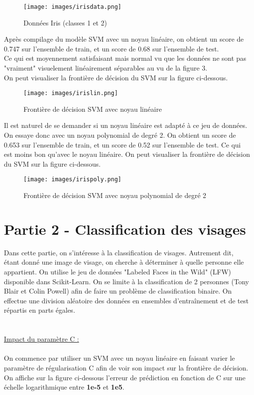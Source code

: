 \documentclass[a4paper, 12pt]{article}
\begin{document}
\begin{figure}[h]
    \centering
    \texttt{[image: images/irisdata.png]}
    \caption{Données Iris (classes 1 et 2)}
    \label{fig:iris_data}

\end{figure}

Après compilage du modèle SVM avec un noyau linéaire, on obtient un score de 0.747 sur l'ensemble de train, et un score de 0.68 sur l'ensemble de test.
\\
Ce qui est moyennement satisfaisant mais normal vu que les données ne sont pas "vraiment" visuelement linéairement séparables au vu de la figure 3.
\\
On peut visualiser la frontière de décision du SVM sur la figure ci-dessous.

\begin{figure}[h]
    \centering
    \texttt{[image: images/irislin.png]}
    \caption{Frontière de décision SVM avec noyau linéaire}
    \label{fig:linear_kernel_iris}
\end{figure}


Il est naturel de se demander si un noyau linéaire est adapté à ce jeu de données. On essaye donc avec un noyau polynomial de degré 2. On obtient un score de 0.653 sur l'ensemble de train, et un score de 0.52 sur l'ensemble de test.
Ce qui est moins bon qu'avec le noyau linéaire. On peut visualiser la frontière de décision du SVM sur la figure ci-dessous.

\begin{figure}[h]
    \centering
    \texttt{[image: images/irispoly.png]}
    \caption{Frontière de décision SVM avec noyau polynomial de degré 2}
    \label{fig:poly2_kernel_iris}
\end{figure}

\vspace{4cm}

\section*{Partie 2 - Classification des visages}

Dans cette partie, on s'intéresse à la classification de visages. Autrement dit, étant donné une image de visage, on cherche à déterminer à quelle personne elle appartient.
On utilise le jeu de données "Labeled Faces in the Wild" (LFW) disponible dans Scikit-Learn. On se limite à la classification de 2 personnes (Tony Blair et Colin Powell) afin de faire un problème de classification binaire.
On effectue une division aléatoire des données en ensembles d'entraînement et de test répartis en parts égales.
\\
\\
\\
\underline{Impact du paramètre C :}
\\
\\
On commence par utiliser un SVM avec un noyau linéaire en faisant varier le paramètre de régularisation C afin de voir son impact sur la frontière de décision.
\\
On affiche sur la figure ci-dessous  l'erreur de prédiction en fonction de C sur une échelle logarithmique entre \textbf{1e-5} et \textbf{1e5}.
\end{document}
